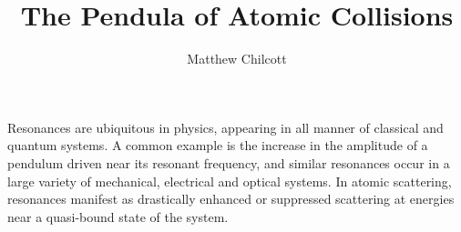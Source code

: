 \documentclass{article}
\title{The Pendula of Atomic Collisions}
\author{Matthew Chilcott}
\date{}
\begin{document}
\maketitle
\thispagestyle{empty}





Resonances are ubiquitous in physics, appearing in all manner of
classical and quantum systems. A common example is the increase in the
amplitude of a pendulum driven near its resonant frequency, and
similar resonances occur in a large variety of mechanical, electrical
and optical systems. In atomic scattering, resonances manifest as
drastically enhanced or suppressed scattering at energies near a
quasi-bound state of the system.
\end{document}
